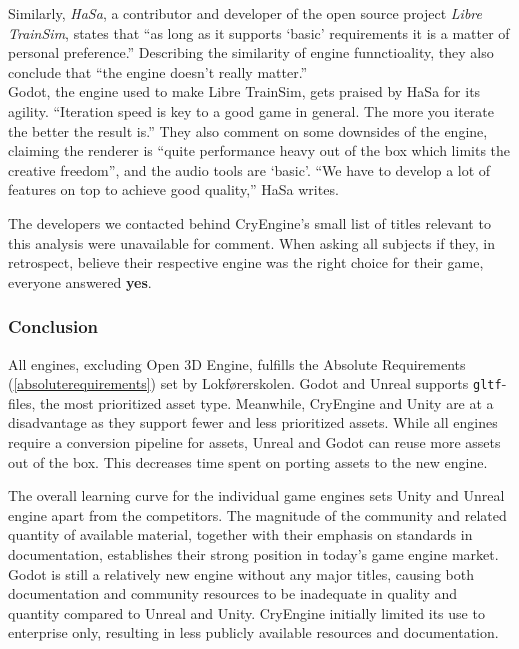 Similarly, \textit{HaSa}, a contributor and developer of the open source project \textit{Libre TrainSim}, states that “as long as it supports `basic' requirements it is a matter of personal preference.” Describing the similarity of engine funnctioality, they also conclude that “the engine doesn't really matter.” \\[0.8cm]

Godot, the engine used to make Libre TrainSim, gets praised by HaSa for its agility. “Iteration speed is key to a good game in general. The more you iterate the better the result is.” They also comment on some downsides of the engine, claiming the renderer is “quite performance heavy out of the box which limits the creative freedom”, and the audio tools are `basic'. “We have to develop a lot of features on top to achieve good quality,” HaSa writes.

The developers we contacted behind CryEngine's small list of titles relevant to this analysis were unavailable for comment. When asking all subjects if they, in retrospect, believe their respective engine was the right choice for their game, everyone answered \textbf{yes}. 

 













\subsubsection{Conclusion}
All engines, excluding Open 3D Engine, fulfills the Absolute Requirements (\ref{absoluterequirements}) set by Lokførerskolen. Godot and Unreal supports \texttt{gltf}-files, the most prioritized asset type. Meanwhile, CryEngine and Unity are at a disadvantage as they support fewer and less prioritized assets. While all engines require a conversion pipeline for assets, Unreal and Godot can reuse more assets out of the box. This decreases time spent on porting assets to the new engine.


The overall learning curve for the individual game engines sets Unity and Unreal engine apart from the competitors. The magnitude of the community and related quantity of available material, together with their emphasis on standards in documentation, establishes their strong position in today's game engine market. Godot is still a relatively new engine without any major titles, causing both documentation and community resources to be inadequate in quality and quantity compared to Unreal and Unity. CryEngine initially limited its use to enterprise only, resulting in less publicly available resources and documentation.

